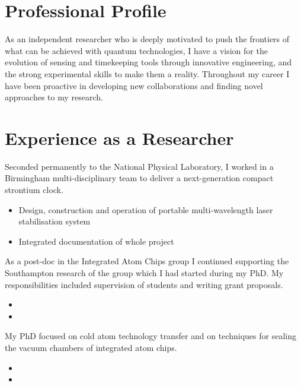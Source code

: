 \documentclass[11pt,a4paper,sans]{moderncv}        %
\begin{document}
\makecvtitle
\vspace{-1.5cm}
\section{Professional Profile}
As an independent researcher who is deeply motivated to push the frontiers of what can be achieved with quantum technologies, I have a vision for the evolution of sensing and timekeeping tools through innovative engineering, and the strong experimental skills to make them a reality. Throughout my career I have been proactive in developing new collaborations and finding novel approaches to my research.

\section{Experience as a Researcher}
{Seconded permanently to the National Physical Laboratory, I worked in a Birmingham multi-disciplinary team to deliver a next-generation compact strontium clock.
\begin{itemize}[leftmargin=1cm]
	\item Design, construction and operation of portable multi-wavelength laser stabilisation system
	\item Integrated documentation of whole project
\end{itemize}
}  %

{As a post-doc in the Integrated Atom Chips group I continued supporting the Southampton research of the group which I had started during my PhD. My responsibilities included supervision of students and writing grant proposals.
\begin{itemize}[leftmargin=1cm]
	\item 
	\item 
\end{itemize}
} 

{My PhD focused on cold atom technology transfer and on techniques for sealing the vacuum chambers of integrated atom chips.
\begin{itemize}[leftmargin=1cm]
	\item 
	\item 
\end{itemize}
}
\end{document}
